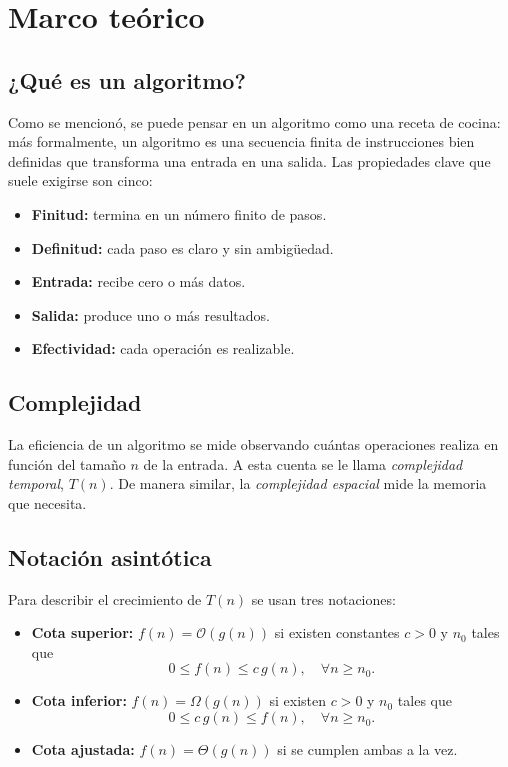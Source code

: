 \documentclass[12pt,letterpaper]{article}
\begin{document}
\section{Marco teórico}
\label{sec:marco}

\subsection{¿Qué es un algoritmo?}
Como se mencionó, se puede pensar en un algoritmo como una receta de cocina: más
formalmente, un algoritmo es una secuencia finita de instrucciones bien
definidas que transforma una entrada en una salida. Las propiedades clave que
suele exigirse son cinco:

\begin{itemize}
    \item \textbf{Finitud:} termina en un número finito de pasos.
    \item \textbf{Definitud:} cada paso es claro y sin ambigüedad.
    \item \textbf{Entrada:} recibe cero o más datos.
    \item \textbf{Salida:} produce uno o más resultados.
    \item \textbf{Efectividad:} cada operación es realizable.
\end{itemize}

\subsection{Complejidad}
La eficiencia de un algoritmo se mide observando cuántas operaciones realiza en 
función del tamaño $n$ de la entrada. A esta cuenta se le llama 
\emph{complejidad temporal}, $T(n)$. De manera similar, la 
\emph{complejidad espacial} mide la memoria que necesita.

\subsection{Notación asintótica}
Para describir el crecimiento de $T(n)$ se usan tres notaciones:

\begin{itemize}
    \item \textbf{Cota superior:} $f(n) = \mathcal{O}(g(n))$ si existen 
    constantes $c>0$ y $n_0$ tales que
    \begin{equation*}
        0 \leq f(n) \leq c\,g(n), \quad \forall n \geq n_0.
    \end{equation*}
    \item \textbf{Cota inferior:} $f(n) = \Omega(g(n))$ si existen $c>0$ y 
    $n_0$ tales que
    \begin{equation*}
        0 \leq c\,g(n) \leq f(n), \quad \forall n \geq n_0.
    \end{equation*}
    \item \textbf{Cota ajustada:} $f(n) = \Theta(g(n))$ si se cumplen ambas a 
    la vez.
\end{itemize}
\end{document}
